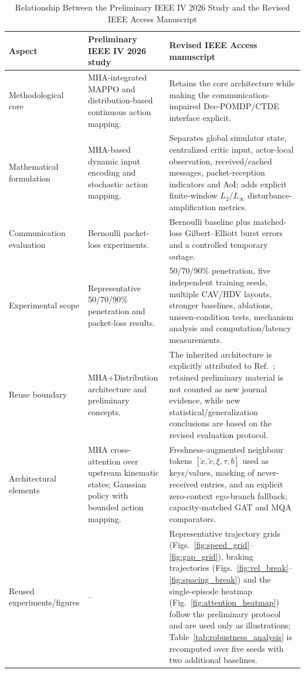 \documentclass{ieeeaccess}
\begin{document}
\begin{table}[htbp]
\centering
\caption{Relationship Between the Preliminary IEEE IV 2026 Study and the Revised IEEE Access Manuscript}
\label{tab:iv_access_novelty}
\renewcommand{\arraystretch}{1.15}
\begin{tabularx}{\textwidth}{|p{3.1cm}|X|X|}
\hline
\textbf{Aspect} & \textbf{Preliminary IEEE IV 2026 study} & \textbf{Revised IEEE Access manuscript} \\ \hline
Methodological core & MHA-integrated MAPPO and distribution-based continuous action mapping. & Retains the core architecture while making the communication-impaired Dec-POMDP/CTDE interface explicit. \\ \hline
Mathematical formulation & MHA-based dynamic input encoding and stochastic action mapping. & Separates global simulator state, centralized critic input, actor-local observation, received/cached messages, packet-reception indicators and AoI; adds explicit finite-window $L_2/L_\infty$ disturbance-amplification metrics. \\ \hline
Communication evaluation & Bernoulli packet-loss experiments. & Bernoulli baseline plus matched-loss Gilbert--Elliott burst errors and a controlled temporary outage. \\ \hline
Experimental scope & Representative 50/70/90\% penetration and packet-loss results. & 50/70/90\% penetration, five independent training seeds, multiple CAV/HDV layouts, stronger baselines, ablations, unseen-condition tests, mechanism analysis and computation/latency measurements. \\ \hline
Reuse boundary & MHA+Distribution architecture and preliminary concepts. & The inherited architecture is explicitly attributed to Ref.~\cite{cai2026integrating}; retained preliminary material is not counted as new journal evidence, while new statistical/generalization conclusions are based on the revised evaluation protocol. \\ \hline
Architectural elements & MHA cross-attention over upstream kinematic states; Gaussian policy with bounded action mapping. & Freshness-augmented neighbour tokens $[\tilde x,\tilde v,\xi,\tau,b]$ used as keys/values, masking of never-received entries, and an explicit zero-context ego-branch fallback; capacity-matched GAT and MQA comparators. \\ \hline
Reused experiments/figures & -- & Representative trajectory grids (Figs.~\ref{fig:speed_grid}--\ref{fig:gap_grid}), braking trajectories (Figs.~\ref{fig:vel_break}--\ref{fig:spacing_break}) and the single-episode heatmap (Fig.~\ref{fig:attention_heatmap}) follow the preliminary protocol and are used only as illustrations; Table~\ref{tab:robustness_analysis} is recomputed over five seeds with two additional baselines. \\ \hline %

\end{tabularx}
\end{table}
\end{document}
